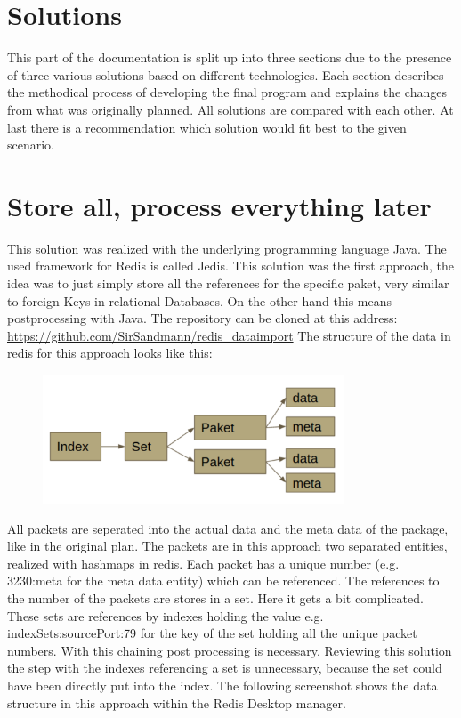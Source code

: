 \chapter{Solutions}
This part of the documentation is split up into three sections due to the presence of three various solutions based on different technologies. Each section describes the methodical process of developing the final program and explains the changes from what was originally planned. All solutions are compared with each other. At last there is a recommendation which solution would fit best to the given scenario. 

\chapter{Store all, process everything later}
This solution was realized with the underlying programming language Java. The used framework for Redis is called Jedis. This solution was the first approach, the idea was to just simply store all the references for the specific paket, very similar to foreign Keys in relational Databases. On the other hand this means postprocessing with Java. The repository can be cloned at this address:
\url{ https://github.com/SirSandmann/redis_dataimport}
The structure of the data in redis for this approach looks like this:

  \begin{figure}[H]
	\centerline{\includegraphics[width=0.8\textwidth]{resources/solution1-1.png}}
\end{figure}

All packets are seperated into the actual data and the meta data of the package, like in the original plan. The packets are in this approach two separated entities, realized with hashmaps in redis. Each packet has a unique number (e.g. 3230:meta for the meta data entity) which can be referenced. The references to the number of the packets are stores in a set. Here it gets a bit complicated. These sets are references by indexes holding the value e.g. indexSets:sourcePort:79 for the key of the set holding all the unique packet numbers. With this chaining post processing is necessary. Reviewing this solution the step with the indexes referencing a set is unnecessary, because the set could have been directly put into the index. The following screenshot shows the data structure in this approach within the Redis Desktop manager.

